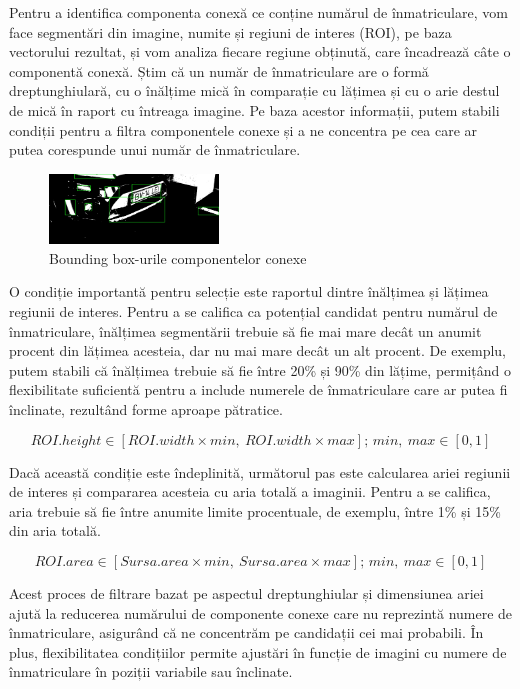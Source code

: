 \documentclass[a4paper,12pt]{report}
\begin{document}
Pentru a identifica componenta conexă ce conține numărul de înmatriculare, vom face segmentări din imagine, numite și regiuni de interes (ROI), pe baza vectorului rezultat, și vom analiza fiecare regiune obținută, care încadrează câte o componentă conexă. Știm că un număr de înmatriculare are o formă dreptunghiulară, cu o înălțime mică în comparație cu lățimea și cu o arie destul de mică în raport cu întreaga imagine. Pe baza acestor informații, putem stabili condiții pentru a filtra componentele conexe și a ne concentra pe cea care ar putea corespunde unui număr de înmatriculare.

\begin{figure}[h]
    \centering
    \includegraphics[width=0.4\textwidth]{images/bboxes.jpg}
    \caption{Bounding box-urile componentelor conexe}
\end{figure}
\FloatBarrier

O condiție importantă pentru selecție este raportul dintre înălțimea și lățimea regiunii de interes. Pentru a se califica ca potențial candidat pentru numărul de înmatriculare, înălțimea segmentării trebuie să fie mai mare decât un anumit procent din lățimea acesteia, dar nu mai mare decât un alt procent. De exemplu, putem stabili că înălțimea trebuie să fie între 20\% și 90\% din lățime, permițând o flexibilitate suficientă pentru a include numerele de înmatriculare care ar putea fi înclinate, rezultând forme aproape pătratice.

\[
    ROI.height \in [ROI.width \times min, \ ROI.width \times max]; \, min, \ max \in [0, 1]
\]

Dacă această condiție este îndeplinită, următorul pas este calcularea ariei regiunii de interes și compararea acesteia cu aria totală a imaginii. Pentru a se califica, aria trebuie să fie între anumite limite procentuale, de exemplu, între 1\% și 15\% din aria totală.

\[
    ROI.area \in [Sursa.area \times min, \ Sursa.area \times max]; \, min, \ max \in [0, 1]
\]

Acest proces de filtrare bazat pe aspectul dreptunghiular și dimensiunea ariei ajută la reducerea numărului de componente conexe care nu reprezintă numere de înmatriculare, asigurând că ne concentrăm pe candidații cei mai probabili. În plus, flexibilitatea condițiilor permite ajustări în funcție de imagini cu numere de înmatriculare în poziții variabile sau înclinate.
\end{document}
